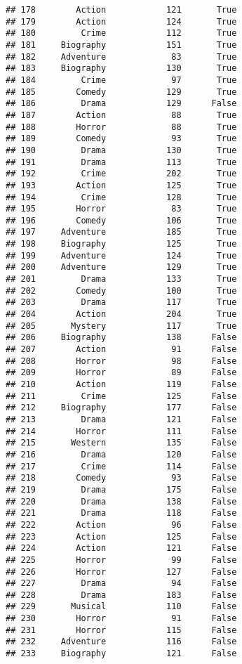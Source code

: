 \documentclass[
]{article}
\begin{document}
\begin{verbatim}
## 178        Action            121       True
## 179        Action            124       True
## 180         Crime            112       True
## 181     Biography            151       True
## 182     Adventure             83       True
## 183     Biography            130       True
## 184         Crime             97       True
## 185        Comedy            129       True
## 186         Drama            129      False
## 187        Action             88       True
## 188        Horror             88       True
## 189        Comedy             93       True
## 190         Drama            130       True
## 191         Drama            113       True
## 192         Crime            202       True
## 193        Action            125       True
## 194         Crime            128       True
## 195        Horror             83       True
## 196        Comedy            106       True
## 197     Adventure            185       True
## 198     Biography            125       True
## 199     Adventure            124       True
## 200     Adventure            129       True
## 201         Drama            133       True
## 202        Comedy            100       True
## 203         Drama            117       True
## 204        Action            204       True
## 205       Mystery            117       True
## 206     Biography            138      False
## 207        Action             91      False
## 208        Horror             98      False
## 209        Horror             89      False
## 210        Action            119      False
## 211         Crime            125      False
## 212     Biography            177      False
## 213         Drama            121      False
## 214        Horror            111      False
## 215       Western            135      False
## 216         Drama            120      False
## 217         Crime            114      False
## 218        Comedy             93      False
## 219         Drama            175      False
## 220         Drama            138      False
## 221         Drama            118      False
## 222        Action             96      False
## 223        Action            125      False
## 224        Action            121      False
## 225        Horror             99      False
## 226        Horror            127      False
## 227         Drama             94      False
## 228         Drama            183      False
## 229       Musical            110      False
## 230        Horror             91      False
## 231        Horror            115      False
## 232     Adventure            116      False
## 233     Biography            121      False

\end{verbatim}
\end{document}
